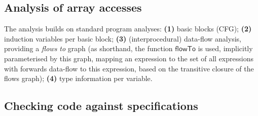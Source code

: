 \subsection{Analysis of array accesses}
\label{subsec:analysis}

\newcommand{\neigh}{\textsf{neigh}}

The analysis builds on standard program analyses:
%
\textbf{(1)} basic blocks (CFG);
\textbf{(2)} induction variables per basic block;
\textbf{(3)} (interprocedural) data-flow analysis, providing a \emph{flows to}
  graph (as shorthand, the function
  $\mathsf{flowTo}$ is used, implicitly parameterised by this graph,
  mapping an expression to the set of all expressions
  with forwards data-flow to this expression, based on the transitive
  closure of the flows graph);
\textbf{(4)} type information per variable.%


\subsection{Checking code against specifications}
\label{subsec:checking}

